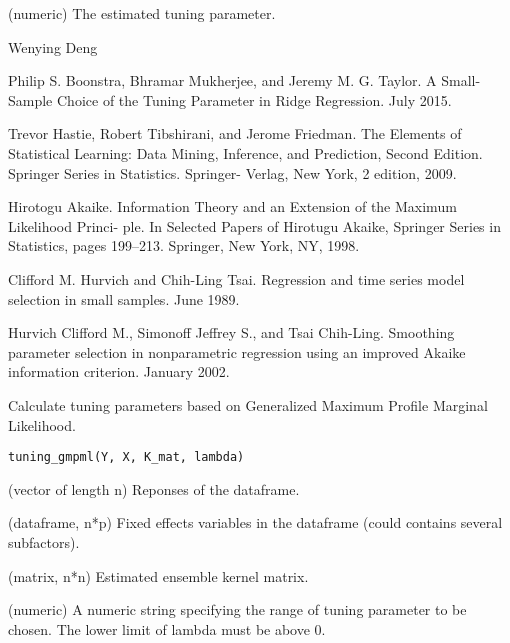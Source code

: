 \documentclass[a4paper]{book}
\begin{document}
%
\begin{Value}
\begin{ldescription}
\item[\code{lambda0}] (numeric) The estimated tuning parameter.
\end{ldescription}
\end{Value}
%
\begin{Author}\relax
Wenying Deng
\end{Author}
%
\begin{References}\relax
Philip S. Boonstra, Bhramar Mukherjee, and Jeremy M. G. Taylor.
A Small-Sample Choice of the Tuning Parameter in Ridge Regression. July
2015.

Trevor Hastie, Robert Tibshirani, and Jerome Friedman. The Elements of
Statistical Learning: Data Mining, Inference, and Prediction, Second
Edition. Springer Series in Statistics. Springer- Verlag, New York, 2
edition, 2009.

Hirotogu Akaike. Information Theory and an Extension of the Maximum
Likelihood Princi- ple. In Selected Papers of Hirotugu Akaike, Springer
Series in Statistics, pages 199–213. Springer, New York, NY, 1998.

Clifford M. Hurvich and Chih-Ling Tsai. Regression and time series model
selection in small samples. June 1989.

Hurvich Clifford M., Simonoff Jeffrey S., and Tsai Chih-Ling. Smoothing
parameter selection in nonparametric regression using an improved Akaike
information criterion. January 2002.
\end{References}
%
\begin{Description}\relax
Calculate tuning parameters based on Generalized Maximum Profile Marginal
Likelihood.
\end{Description}
%
\begin{Usage}
\begin{verbatim}
tuning_gmpml(Y, X, K_mat, lambda)
\end{verbatim}
\end{Usage}
%
\begin{Arguments}
\begin{ldescription}
\item[\code{Y}] (vector of length n) Reponses of the dataframe.

\item[\code{X}] (dataframe, n*p) Fixed effects variables in the dataframe (could
contains several subfactors).

\item[\code{K\_mat}] (matrix, n*n) Estimated ensemble kernel matrix.

\item[\code{lambda}] (numeric) A numeric string specifying the range of tuning parameter 
to be chosen. The lower limit of lambda must be above 0.
\end{ldescription}
\end{Arguments}
\end{document}
